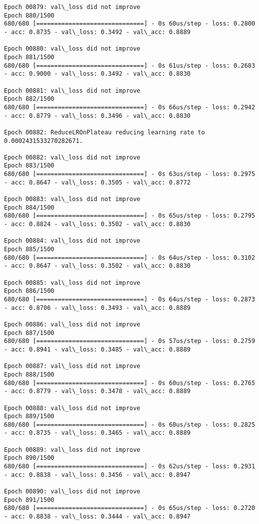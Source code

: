 \documentclass[11pt]{article}
\begin{document}
\begin{Verbatim}[commandchars=\\\{\}]
Epoch 00879: val\_loss did not improve
Epoch 880/1500
680/680 [==============================] - 0s 60us/step - loss: 0.2800 - acc: 0.8735 - val\_loss: 0.3492 - val\_acc: 0.8889

Epoch 00880: val\_loss did not improve
Epoch 881/1500
680/680 [==============================] - 0s 61us/step - loss: 0.2683 - acc: 0.9000 - val\_loss: 0.3492 - val\_acc: 0.8830

Epoch 00881: val\_loss did not improve
Epoch 882/1500
680/680 [==============================] - 0s 66us/step - loss: 0.2942 - acc: 0.8779 - val\_loss: 0.3496 - val\_acc: 0.8830

Epoch 00882: ReduceLROnPlateau reducing learning rate to 0.0002431533270282671.

Epoch 00882: val\_loss did not improve
Epoch 883/1500
680/680 [==============================] - 0s 63us/step - loss: 0.2975 - acc: 0.8647 - val\_loss: 0.3505 - val\_acc: 0.8772

Epoch 00883: val\_loss did not improve
Epoch 884/1500
680/680 [==============================] - 0s 65us/step - loss: 0.2795 - acc: 0.8824 - val\_loss: 0.3502 - val\_acc: 0.8830

Epoch 00884: val\_loss did not improve
Epoch 885/1500
680/680 [==============================] - 0s 64us/step - loss: 0.3102 - acc: 0.8647 - val\_loss: 0.3502 - val\_acc: 0.8830

Epoch 00885: val\_loss did not improve
Epoch 886/1500
680/680 [==============================] - 0s 64us/step - loss: 0.2873 - acc: 0.8706 - val\_loss: 0.3493 - val\_acc: 0.8889

Epoch 00886: val\_loss did not improve
Epoch 887/1500
680/680 [==============================] - 0s 57us/step - loss: 0.2759 - acc: 0.8941 - val\_loss: 0.3485 - val\_acc: 0.8889

Epoch 00887: val\_loss did not improve
Epoch 888/1500
680/680 [==============================] - 0s 60us/step - loss: 0.2765 - acc: 0.8779 - val\_loss: 0.3478 - val\_acc: 0.8889

Epoch 00888: val\_loss did not improve
Epoch 889/1500
680/680 [==============================] - 0s 60us/step - loss: 0.2825 - acc: 0.8735 - val\_loss: 0.3465 - val\_acc: 0.8889

Epoch 00889: val\_loss did not improve
Epoch 890/1500
680/680 [==============================] - 0s 62us/step - loss: 0.2931 - acc: 0.8838 - val\_loss: 0.3456 - val\_acc: 0.8947

Epoch 00890: val\_loss did not improve
Epoch 891/1500
680/680 [==============================] - 0s 65us/step - loss: 0.2720 - acc: 0.8838 - val\_loss: 0.3444 - val\_acc: 0.8947


\end{Verbatim}
\end{document}
